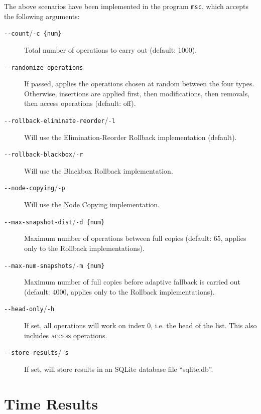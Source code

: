 The above scenarios have been implemented in the program \texttt{msc}, which
accepts the following arguments:

\begin{description}

  \item[\texttt{-\@{}-count}/\texttt{-c \{num\}}] Total number of operations to
  carry out (default: 1000).

  \item[\texttt{-\@{}-randomize-operations}] If passed, applies the operations
  chosen at random between the four types. Otherwise, insertions are applied
  first, then modifications, then removals, then access operations (default:
  off).

  \item[\texttt{-\@{}-rollback-eliminate-reorder}/\texttt{-l}] Will use the
  Elimination-Reorder Rollback implementation (default).

  \item[\texttt{-\@{}-rollback-blackbox}/\texttt{-r}] Will use the Blackbox
  Rollback implementation.

  \item[\texttt{-\@{}-node-copying}/\texttt{-p}] Will use the Node Copying
  implementation.

  \item[\texttt{-\@{}-max-snapshot-dist}/\texttt{-d \{num\}}] Maximum number of
  operations between full copies (default: 65, applies only to the Rollback
  implementations).

  \item[\texttt{-\@{}-max-num-snapshots}/\texttt{-m \{num\}}] Maximum number of
  full copies before adaptive fallback is carried out (default: 4000, applies
  only to the Rollback implementations).

  \item[\texttt{-\@{}-head-only}/\texttt{-h}] If set, all operations will work
  on index 0, i.e. the head of the list. This also includes \textsc{access}
  operations.

  \item[\texttt{-\@{}-store-results}/\texttt{-s}] If set, will store results in
  an SQLite database file ``sqlite.db''.
  
\end{description}

\section{Time Results}

